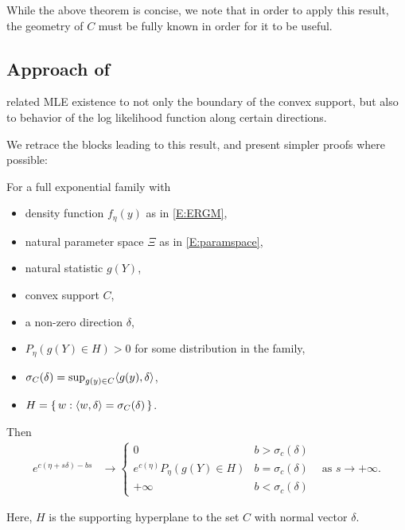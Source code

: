 While the above theorem is concise, we note that in order to apply this result, the geometry of $C$ must be fully known in order for it to be useful.

\subsection{Approach of \citet{Geyer:gdor}}
\citet{Geyer:1990,Geyer:gdor} related MLE existence to
 not only the boundary of the convex support, but also to behavior of the log likelihood function along certain directions.

We retrace the blocks leading to this result, and present simpler proofs where possible:
\begin{theorem}\label{Thm:e_c}
For a full exponential family with
\begin{itemize}
\item density function $f_\eta(y)$ as in \eqref{E:ERGM},
\item natural parameter space $\Xi$ as in \eqref{E:paramspace},
\item natural statistic $g(Y)$,
\item convex support $C$,
\item  a non-zero direction $\delta$,
\item $P_\eta(g(Y) \in H ) > 0$ for some distribution in the family,
\item $\sigma_C (\delta) = \sup_{g(y) \in C} \langle  g(y), \delta \rangle$,
\item $H = \{\, w: \langle w, \delta \rangle = \sigma_C(\delta)  \,\}$.
\end{itemize}
Then
\begin{align*}
e^{c(\eta + s \delta) - bs} &\to 
		\begin{cases} 
			0 									& b > \sigma_c(\delta) \\
			e^{c(\eta)} P_\eta(g(Y) \in H ) 		& b = \sigma_c(\delta) \\
			+\infty								& b < \sigma_c(\delta)
		\end{cases}
& \text{as } s \to +\infty.
\end{align*}

\end{theorem}
Here, $H$ is the supporting hyperplane to the set $C$ with normal vector $\delta$.

